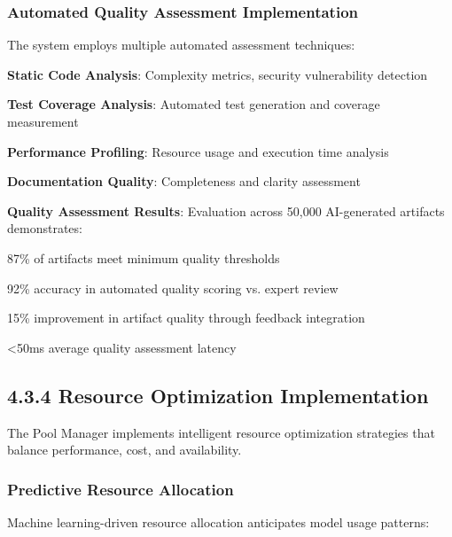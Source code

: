 \subsubsection*{Automated Quality Assessment Implementation}

The system employs multiple automated assessment techniques:

\begin{compactlist}
    \item \textbf{Static Code Analysis}: Complexity metrics, security vulnerability detection
    \item \textbf{Test Coverage Analysis}: Automated test generation and coverage measurement
    \item \textbf{Performance Profiling}: Resource usage and execution time analysis
    \item \textbf{Documentation Quality}: Completeness and clarity assessment
\end{compactlist}

\begin{successbox}
\textbf{Quality Assessment Results}:
Evaluation across 50,000 AI-generated artifacts demonstrates:
\begin{compactlist}
    \item 87\% of artifacts meet minimum quality thresholds
    \item 92\% accuracy in automated quality scoring vs. expert review
    \item 15\% improvement in artifact quality through feedback integration
    \item <50ms average quality assessment latency
\end{compactlist}
\end{successbox}

\subsection*{4.3.4 Resource Optimization Implementation}

The Pool Manager implements intelligent resource optimization strategies that balance performance, cost, and availability.

\subsubsection*{Predictive Resource Allocation}

Machine learning-driven resource allocation anticipates model usage patterns:


